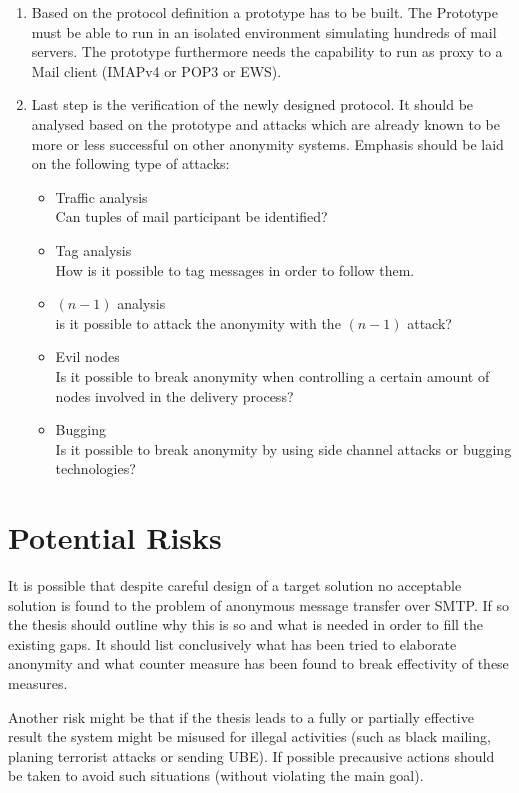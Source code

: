 \documentclass[twocolumn,a4paper,10pt,english]{article}
\newenvironment{myitemize}{\begin{itemize}\setlength{\itemsep}{0em}}{\end{itemize}}
\begin{document}
\begin{enumerate}
\item Based on the protocol definition a prototype has to be built. The Prototype must be able to run in an isolated environment simulating hundreds of mail servers. The prototype furthermore needs the capability to run as proxy to a Mail client (IMAPv4 or POP3 or EWS).\par

\item Last step is the verification of the newly designed protocol. It should be analysed based on the prototype and attacks which are already known to be more or less successful on other anonymity systems. Emphasis should be laid on the following type of attacks:\par
\begin{myitemize}
\item Traffic analysis\\Can tuples of mail participant be identified?  
\item Tag analysis\\How is it possible to tag messages in order to follow them.
\item $(n-1)$ analysis\\is it possible to attack the anonymity with the $(n-1)$ attack?
\item Evil nodes\\ Is it possible to break anonymity when controlling a certain amount of nodes involved in the delivery process?
\item Bugging\\Is it possible to break anonymity by using side channel attacks or bugging technologies?
\end{myitemize}
\end{enumerate}

\section{Potential Risks}
It is possible that despite careful design of a target solution no acceptable solution is found to the problem of anonymous message transfer over SMTP. If so the thesis should outline why this is so and what is needed in order to fill the existing gaps. It should list conclusively what has been tried to elaborate anonymity and what counter measure has been found to break effectivity of these measures.\par

Another risk might be that if the thesis leads to a fully or partially effective result the system might be misused for illegal activities (such as black mailing, planing terrorist attacks or sending UBE). If possible precausive actions should be taken to avoid such situations (without violating the main goal).\par
\end{document}
